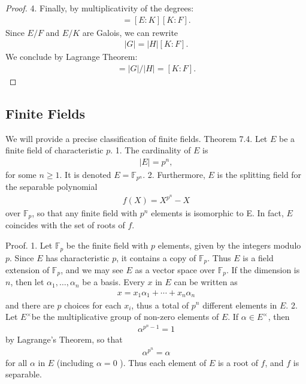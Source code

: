 \documentclass{article}
\begin{document}
\begin{proof}
4. Finally, by multiplicativity of the degrees:
\begin{align*}
[E: F]=[E: K][K: F] .
\end{align*}
Since $E / F$ and $E / K$ are Galois, we can rewrite
\begin{align*}
|G|=|H|[K: F] .
\end{align*}
We conclude by Lagrange Theorem:
\begin{align*}
[G: H]=|G| /|H|=[K: F] .
\end{align*}
\end{proof} 

\subsection{Finite Fields}
We will provide a precise classification of finite fields.
Theorem 7.4. Let $E$ be a finite field of characteristic $p$.
1. The cardinality of $E$ is
\begin{align*}
|E|=p^{n},
\end{align*}
for some $n \geq 1$. It is denoted $E=\mathbb{F}_{p^{n}}$.
2. Furthermore, $E$ is the splitting field for the separable polynomial
\begin{align*}
f(X)=X^{p^{n}}-X
\end{align*}
over $\mathbb{F}_{p}$, so that any finite field with $p^{n}$ elements is isomorphic to E. In fact, $E$ coincides with the set of roots of $f$.

Proof. 1. Let $\mathbb{F}_{p}$ be the finite field with $p$ elements, given by the integers modulo $p$. Since $E$ has characteristic $p$, it contains a copy of $\mathbb{F}_{p}$. Thus $E$ is a field extension of $\mathbb{F}_{p}$, and we may see $E$ as a vector space over $\mathbb{F}_{p}$. If the dimension is $n$, then let $\alpha_{1}, \ldots, \alpha_{n}$ be a basis. Every $x$ in $E$ can be written as
\begin{align*}
x=x_{1} \alpha_{1}+\cdots+x_{n} \alpha_{n}
\end{align*}
and there are $p$ choices for each $x_{i}$, thus a total of $p^{n}$ different elements in $E$.
2. Let $E^{\times}$be the multiplicative group of non-zero elements of $E$. If $\alpha \in E^{\times}$, then
\begin{align*}
\alpha^{p^{n}-1}=1
\end{align*}
by Lagrange's Theorem, so that
\begin{align*}
\alpha^{p^{n}}=\alpha
\end{align*}
for all $\alpha$ in $E$ (including $\alpha=0$ ). Thus each element of $E$ is a root of $f$, and $f$ is separable.
\end{document}
